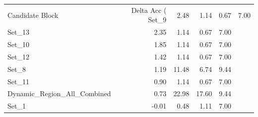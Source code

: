 \begin{tabular}{lrrrr}
\toprule
Candidate Block & Delta Acc (%
\midrule
Set_9 & 2.48 & 1.14 & 0.67 & 7.00 \\
Set_13 & 2.35 & 1.14 & 0.67 & 7.00 \\
Set_10 & 1.85 & 1.14 & 0.67 & 7.00 \\
Set_12 & 1.42 & 1.14 & 0.67 & 7.00 \\
Set_8 & 1.19 & 11.48 & 6.74 & 9.44 \\
Set_11 & 0.90 & 1.14 & 0.67 & 7.00 \\
Dynamic_Region_All_Combined & 0.73 & 22.98 & 17.60 & 9.44 \\
Set_1 & -0.01 & 0.48 & 1.11 & 7.00 \\
\bottomrule
\end{tabular}
